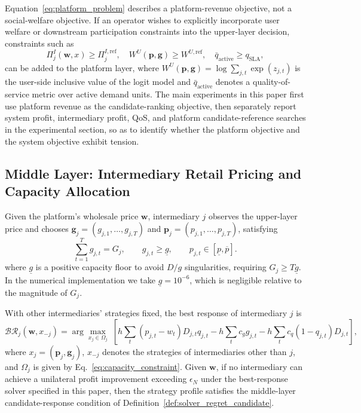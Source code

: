 \documentclass[11pt,a4paper]{article}
\newcommand{\D}{D}
\newcommand{\w}{\boldsymbol{w}}
\newcommand{\p}{\boldsymbol{p}}
\newcommand{\g}{\boldsymbol{g}}
\begin{document}
Equation~\eqref{eq:platform_problem} describes a platform-revenue objective, not a social-welfare objective. If an operator wishes to explicitly incorporate user welfare or downstream participation constraints into the upper-layer decision, constraints such as
\begin{equation}
  \Pi^I_j(\w,x)\ge \Pi^{I,\mathrm{ref}}_j,\quad
  W^U(\p,\g)\ge W^{U,\mathrm{ref}},\quad
  \bar q_{\mathrm{active}}\ge q_{\mathrm{SLA}},
  \label{eq:deployment_constraints}
\end{equation}
can be added to the platform layer, where $W^U(\p,\g)=\log\sum_{j,t}\exp(z_{j,t})$ is the user-side inclusive value of the logit model and $\bar q_{\mathrm{active}}$ denotes a quality-of-service metric over active demand units. The main experiments in this paper first use platform revenue as the candidate-ranking objective, then separately report system profit, intermediary profit, QoS, and platform candidate-reference searches in the experimental section, so as to identify whether the platform objective and the system objective exhibit tension.

\subsection{Middle Layer: Intermediary Retail Pricing and Capacity Allocation}
\label{sec:middle_intermediary}

Given the platform's wholesale price $\w$, intermediary $j$ observes the upper-layer price and chooses $\g_j=(g_{j,1},\ldots,g_{j,T})$ and $\p_j=(p_{j,1},\ldots,p_{j,T})$, satisfying
\begin{equation}
  \sum_{t=1}^{T}g_{j,t}=G_j,\qquad g_{j,t}\ge \underline g,\qquad
  p_{j,t}\in[\underline p,\overline p].
  \label{eq:capacity_constraint}
\end{equation}
where $\underline g$ is a positive capacity floor to avoid $D/g$ singularities, requiring $G_j\ge T\underline g$. In the numerical implementation we take $\underline g=10^{-6}$, which is negligible relative to the magnitude of $G_j$.

With other intermediaries' strategies fixed, the best response of intermediary $j$ is
\begin{equation}
  \mathcal{BR}_j(\w,x_{-j})=
  \arg\max_{x_j\in\Omega_j}\;
  \left[
  h\sum_{t}(p_{j,t}-w_t)\D_{j,t}q_{j,t}
  -h\sum_t c_g g_{j,t}
  -h\sum_t c_q(1-q_{j,t})\D_{j,t}
  \right],
  \label{eq:broker_problem}
\end{equation}
where $x_j=(\p_j,\g_j)$, $x_{-j}$ denotes the strategies of intermediaries other than $j$, and $\Omega_j$ is given by Eq.~\eqref{eq:capacity_constraint}. Given $\w$, if no intermediary can achieve a unilateral profit improvement exceeding $\epsilon_N$ under the best-response solver specified in this paper, then the strategy profile satisfies the middle-layer candidate-response condition of Definition~\ref{def:solver_regret_candidate}.
\end{document}
